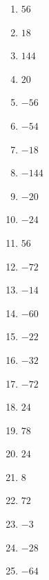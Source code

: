 \documentclass[../../syllabus_1.tex]{subfiles}
\begin{document}
\begin{solution}
    \begin{enumerate}[cols=4]
        \item \(56\)
        \item \(18\)
        \item \(144\)
        \item \(20\)
        \item \(-56\)
        \item \(-54\)
        \item \(-18\)
        \item \(-144\)
        \item \(-20\)
        \item \(-24\)
        \item \(56\)
        \item \(-72\)
        \item \(-14\)
        \item \(-60\)
        \item \(-22\)
        \item \(-32\)
        \item \(-72\)
        \item \(24\)
        \item \(78\)
        \item \(24\)
        \item \(8\)
        \item \(72\)
        \item \(-3\)
        \item \(-28\)
        \item \(-64\)
    \end{enumerate}
\end{solution}
\end{document}

